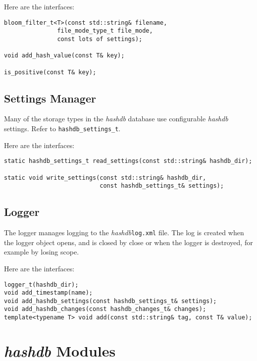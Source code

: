\documentclass[12pt,twoside]{article}
\newcommand{\hdb}{\emph{hashdb}\xspace}
\begin{document}
Here are the interfaces:

\begin{small}
\begin{verbatim}
bloom_filter_t<T>(const std::string& filename,
               file_mode_type_t file_mode,
               const lots of settings);

void add_hash_value(const T& key);

is_positive(const T& key);
\end{verbatim}
\end{small}

\subsection{Settings Manager}
Many of the storage types in the \hdb database use configurable \hdb settings.
Refer to \texttt{hashdb\_settings\_t}.

Here are the interfaces:

\begin{small}
\begin{verbatim}
static hashdb_settings_t read_settings(const std::string& hashdb_dir);

static void write_settings(const std::string& hashdb_dir,
                           const hashdb_settings_t& settings);
\end{verbatim}
\end{small}

\subsection{Logger}
The logger manages logging to the \hdb \texttt{log.xml} file.
The log is created when the logger object opens,
and is closed by close or when the logger is destroyed,
for example by losing scope.
 
Here are the interfaces:

\begin{small}
\begin{verbatim}
logger_t(hashdb_dir);
void add_timestamp(name);
void add_hashdb_settings(const hashdb_settings_t& settings);
void add_hashdb_changes(const hashdb_changes_t& changes);
template<typename T> void add(const std::string& tag, const T& value);
\end{verbatim}
\end{small}

\section{\hdb Modules}
\end{document}
